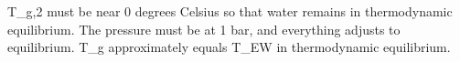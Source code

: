T_g,2 must be near 0 degrees Celsius so that water remains in thermodynamic equilibrium. The pressure must be at 1 bar, and everything adjusts to equilibrium.  
T_g approximately equals T_EW in thermodynamic equilibrium.